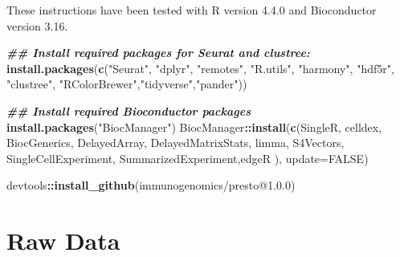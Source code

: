\documentclass[
]{book}
\newenvironment{Shaded}{\begin{snugshade}}{\end{snugshade}}
\newcommand{\AttributeTok}[1]{\textcolor[rgb]{0.13,0.29,0.53}{#1}}
\newcommand{\ConstantTok}[1]{\textcolor[rgb]{0.56,0.35,0.01}{#1}}
\newcommand{\DocumentationTok}[1]{\textcolor[rgb]{0.56,0.35,0.01}{\textbf{\textit{#1}}}}
\newcommand{\FunctionTok}[1]{\textcolor[rgb]{0.13,0.29,0.53}{\textbf{#1}}}
\newcommand{\NormalTok}[1]{#1}
\newcommand{\SpecialCharTok}[1]{\textcolor[rgb]{0.81,0.36,0.00}{\textbf{#1}}}
\newcommand{\StringTok}[1]{\textcolor[rgb]{0.31,0.60,0.02}{#1}}
\begin{document}
These instructions have been tested with R version 4.4.0 and Bioconductor version 3.16.

\begin{Shaded}
\begin{Highlighting}[]
\DocumentationTok{\#\# Install required packages for Seurat and clustree:}
\FunctionTok{install.packages}\NormalTok{(}\FunctionTok{c}\NormalTok{(}\StringTok{"Seurat"}\NormalTok{, }\StringTok{"dplyr"}\NormalTok{, }\StringTok{"remotes"}\NormalTok{, }\StringTok{"R.utils"}\NormalTok{, }\StringTok{"harmony"}\NormalTok{, }
                   \StringTok{"hdf5r"}\NormalTok{, }\StringTok{"clustree"}\NormalTok{, }\StringTok{"RColorBrewer"}\NormalTok{,}\StringTok{"tidyverse"}\NormalTok{,}\StringTok{"pander"}\NormalTok{))}

\DocumentationTok{\#\# Install required Bioconductor packages}
\FunctionTok{install.packages}\NormalTok{(}\StringTok{"BiocManager"}\NormalTok{)}
\NormalTok{BiocManager}\SpecialCharTok{::}\FunctionTok{install}\NormalTok{(}\FunctionTok{c}\NormalTok{(}\StringTok{\textquotesingle{}SingleR\textquotesingle{}}\NormalTok{, }\StringTok{\textquotesingle{}celldex\textquotesingle{}}\NormalTok{,}
                       \StringTok{\textquotesingle{}BiocGenerics\textquotesingle{}}\NormalTok{, }\StringTok{\textquotesingle{}DelayedArray\textquotesingle{}}\NormalTok{, }\StringTok{\textquotesingle{}DelayedMatrixStats\textquotesingle{}}\NormalTok{,}
                       \StringTok{\textquotesingle{}limma\textquotesingle{}}\NormalTok{, }\StringTok{\textquotesingle{}S4Vectors\textquotesingle{}}\NormalTok{, }\StringTok{\textquotesingle{}SingleCellExperiment\textquotesingle{}}\NormalTok{,}
                       \StringTok{\textquotesingle{}SummarizedExperiment\textquotesingle{}}\NormalTok{,}\StringTok{\textquotesingle{}edgeR\textquotesingle{}}\NormalTok{ ),}
                     \AttributeTok{update=}\ConstantTok{FALSE}\NormalTok{)}


\NormalTok{devtools}\SpecialCharTok{::}\FunctionTok{install\_github}\NormalTok{(}\StringTok{\textquotesingle{}immunogenomics/presto@1.0.0\textquotesingle{}}\NormalTok{)}
\end{Highlighting}
\end{Shaded}

\section{Raw Data}\label{raw-data}
\end{document}
